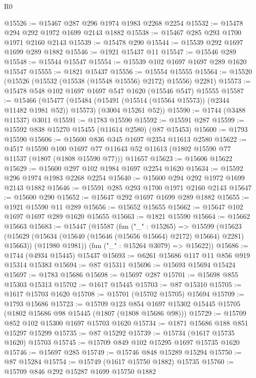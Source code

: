 \begin{lexlean}{R0}
\begin{coremodule}
@15526 := @15467 @287 @296 @1974 @1983 @2268 @2254
@15532 := @15478 @294 @292 @1972 @1699 @2143 @1882
@15538 := @15467 @285 @293 @1700 @1971 @2160 @2143
@15539 := @15478 @290
@15544 := @15539 @292 @1697 @1699 @289 @1882
@15546 := @1921 @15437 @11
@15547 := @15546 @289
@15548 := @15544 @15547
@15554 := @15539 @102 @1697 @1697 @289 @1620 @15547
@15555 := @1821 @15437
@15556 := @15554 @15555
@15564 := @15520 (@15526 (@15532 (@15538 (@15548 @15556) @2172) @15556) @2281)
@15573 := @15478 @548 @102 @1697 @1697 @547 @1620 (@15546 @547) @15555
@15587 := @15466
    (@15477
      (@15484 (@15491 (@15514 (@15564 @15573)) (@2344 @11482 @1981 @52)) @15573)
      (@3004 @15261 @52))
@15590 := @1744 (@3488 @11537) @3011
@15591 := @1783 @15590
@15592 := @15591 @287
@15599 := @15592 @838 @15270 @15455 (@11614 @2580) (@87 @15453)
@15600 := @1793 @15590
@15606 := @15600 @836 @345 @1697 @2354 @11613 @2580
@15622 := @4517
    @15590
    @100
    @1697
    @77
    @11643
    @52
    @11613
    (@1802 @15590 @77 @11537 (@1807 (@1808 @15590 @77)))
    @11657
@15623 := @15606 @15622
@15629 := @15600 @297 @102 @1984 @1697 @2254 @1620
@15634 := @15592 @296 @1974 @1983 @2268 @2254
@15640 := @15600 @294 @292 @1972 @1699 @2143 @1882
@15646 := @15591 @285 @293 @1700 @1971 @2160 @2143
@15647 := @15600 @290
@15652 := @15647 @292 @1697 @1699 @289 @1882
@15655 := @1921 @15590 @11 @289
@15656 := @15652 @15655
@15662 := @15647 @102 @1697 @1697 @289 @1620 @15655
@15663 := @1821 @15590
@15664 := @15662 @15663
@15683 := @15447
    (@15587
      (fun ("_" : @15265) =>
      @15599
        (@15623 (@15629 (@15634 (@15640 (@15646 (@15656 @15664) @2172) @15664) @2281) @15663))
        (@11980 @1981))
      (fun ("_" : @15264 @3079) => @15622))
@15686 := @1744 (@4934 @15445) @15437
@15693 := @6261 @15686 @117 @11 @856 @919 @15314 @15383
@15694 := @87 @15311
@15696 := @15693 @15694 @15424
@15697 := @1783 @15686
@15698 := @15697 @287
@15701 := @15698 @855 @15303 @15313
@15702 := @1617 @15445
@15703 := @87 @15310
@15705 := @1617 @15703 @1620
@15708 := @15701 (@15702 @15705) @15694
@15709 := @1793 @15686
@15723 := @15709
    @123
    @854
    @1697
    @15302
    @15445
    @15705
    (@1802 @15686 @98 @15445 (@1807 (@1808 @15686 @98)))
@15729 := @15709 @852 @102 @15300 @1697 @15703 @1620
@15734 := @1871 @15686 @188 @851 @15297 @15299
@15735 := @87 @15292
@15739 := @15734 (@1617 @15735 @1620) @15703
@15745 := @15709 @849 @102 @15295 @1697 @15735 @1620
@15746 := @15697 @285
@15749 := @15746 @848 @15289 @15294
@15750 := @87 @15284
@15754 := @15749 (@1617 @15750 @1882) @15735
@15760 := @15709 @846 @292 @15287 @1699 @15750 @1882

\end{coremodule}
\end{lexlean}
